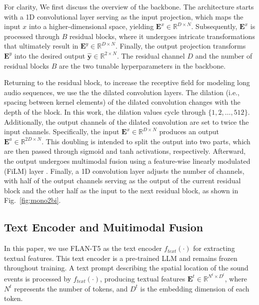 \documentclass{IEEEtran}
\begin{document}
For clarity, We first discuss the overview of the backbone. The architecture starts with a 1D convolutional layer serving as the input projection, which maps the input $x$ into a higher-dimensional space, yielding $\mathbf{E}^{x} \in \mathbb{R}^{D \times N}$. Subsequently, $\mathbf{E}^{x}$ is processed through $B$ residual blocks, where it undergoes intricate transformations that ultimately result in $\mathbf{E}^{y} \in \mathbb{R}^{D \times N}$. Finally, the output projection transforms $\mathbf{E}^{y}$ into the desired output $\hat{\mathbf{y}} \in \mathbb{R}^{2 \times N}$. The residual channel $D$ and the number of residual blocks $B$ are the two tunable hyperparameters in the backbone.

Returning to the residual block, to increase the receptive field for modeling long audio sequences, we use the the dilated convolution layers. The dilation (i.e., spacing between kernel elements) of the dilated convolution changes with the depth of the block. In this work, the dilation values cycle through $\{1, 2, \dots, 512\}$. Additionally, the output channels of the dilated convolution are set to twice the input channels. Specifically, the input $\mathbf{E}^{x} \in \mathbb{R}^{D \times N}$ produces an output $\mathbf{E}^a \in \mathbb{R}^{2D \times N}$. This doubling is intended to split the output into two parts, which are then passed through sigmoid and tanh activations, respectively. Afterward, the output undergoes multimodal fusion using a feature-wise linearly modulated (FiLM) layer \cite{perez2018film}. Finally, a 1D convolution layer adjusts the number of channels, with half of the output channels serving as the output of the current residual block and the other half as the input to the next residual block, as shown in Fig.~\ref{fig:mono2bi}.

\subsection{Text Encoder and Muitimodal Fusion} \label{subsec:text}
In this paper, we use FLAN-T5 \cite{chung2024scaling} as the text encoder $f_{text}(\cdot)$ for extracting textual features. This text encoder is a pre-trained LLM and remains frozen throughout training. A text prompt describing the spatial location of the sound events is processed by $f_{text}(\cdot)$, producing textual features $\mathbf{E}^{t} \in \mathbb{R}^{N^t \times D^t}$, where $N^t$ represents the number of tokens, and $D^t$ is the embedding dimension of each token.
\end{document}
